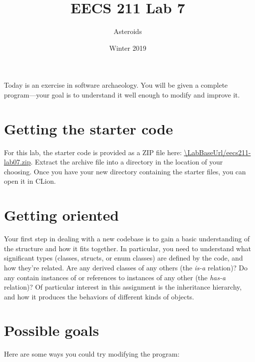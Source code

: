 \documentclass{tufte-handout}
\title{EECS 211 Lab 7}
\author{Asteroids}
\date{Winter 2019}
\def\ThisLabBase{eecs211-lab07}
\def\ThisLabUrl{\LabBaseUrl/\ThisLabBase.zip}
\begin{document}
\maketitle

Today is an exercise in software archaeology. You will be given a
complete program---your goal is to understand it well enough to modify
and improve it.

\section{Getting the starter code}

For this lab, the starter code is provided as a ZIP file here:
\url{\ThisLabUrl}. Extract the archive file into a directory in the
location of your choosing. Once you have your new directory containing
the starter files, you can open it in CLion.

\section{Getting oriented}

Your first step in dealing with a new codebase is to gain a basic
understanding of the structure and how it fits together. In
particular, you need to understand what significant types (classes,
structs, or enum classes) are defined by the code, and how they're
related. Are any derived classes of any others (the \emph{is-a}
relation)? Do any contain instances of or references to instances of any
other (the \emph{has-a} relation)? Of particular interest in this
assignment is the inheritance hierarchy, and how it produces the
behaviors of different kinds of objects.

\section{Possible goals}

Here are some ways you could try modifying the program:
\end{document}
